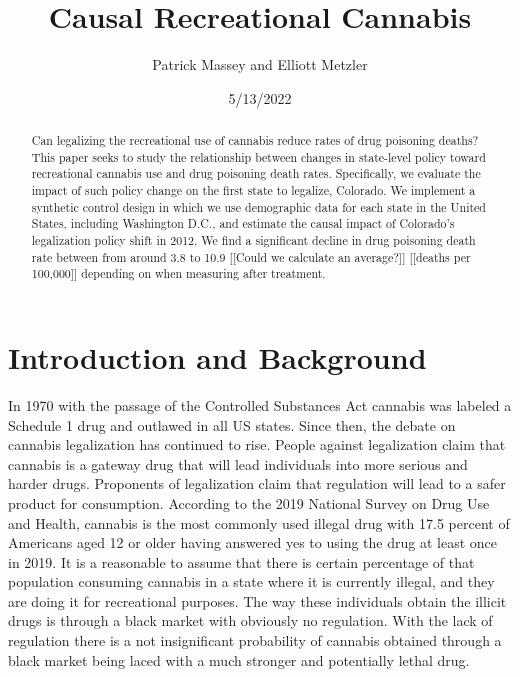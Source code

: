 \documentclass{article}
\author{Patrick Massey and Elliott Metzler}
\title{Causal Recreational Cannabis}
\date{5/13/2022}
\begin{document}
\maketitle

\begin{abstract}

Can legalizing the recreational use of cannabis reduce rates of drug poisoning deaths? This paper seeks to study the relationship between changes in state-level policy toward recreational cannabis use and drug poisoning death rates. Specifically, we evaluate the impact of such policy change on the first state to legalize, Colorado. We implement a synthetic control design in which we use demographic data for each state in the United States, including Washington D.C., and estimate the causal impact of Colorado's legalization policy shift in 2012. We find a significant decline in drug poisoning death rate between from around 3.8 to 10.9 [[Could we calculate an average?]] [[deaths per 100,000]] depending on when measuring after treatment.

\end{abstract}

\newpage

\section{Introduction and Background}

In 1970 with the passage of the Controlled Substances Act cannabis was labeled a Schedule 1 drug and outlawed in all US states. Since then, the debate on cannabis legalization has continued to rise. People against legalization claim that cannabis is a gateway drug that will lead individuals into more serious and harder drugs. Proponents of legalization claim that regulation will lead to a safer product for consumption. According to the 2019 National Survey on Drug Use and Health, cannabis is the most commonly used illegal drug with 17.5 percent of Americans aged 12 or older having answered yes to using the drug at least once in 2019.  It is a reasonable to assume that there is certain percentage of that population consuming cannabis in a state where it is currently illegal, and they are doing it for recreational purposes. The way these individuals obtain the illicit drugs is through a black market with obviously no regulation. With the lack of regulation there is a not insignificant probability of cannabis obtained through a black market being laced with a much stronger and potentially lethal drug.
\end{document}
